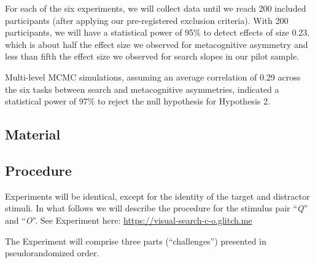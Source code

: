 \documentclass[
  english,
  man,floatsintext]{apa6}
\begin{document}
For each of the six experiments, we will collect data until we reach 200 included participants (after applying our pre-registered exclusion criteria). With 200 participants, we will have a statistical power of 95\% to detect effects of size 0.23, which is about half the effect size we observed for metacognitive asymmetry and less than fifth the effect size we observed for search slopes in our pilot sample.

Multi-level MCMC simulations, assuming an average correlation of 0.29 across the six tasks between search and metacognitive asymmetries, indicated a statistical power of 97\% to reject the null hypothesis for Hypothesis 2.

\hypertarget{material}{%
\subsection{Material}\label{material}}

\hypertarget{procedure}{%
\subsection{Procedure}\label{procedure}}

Experiments will be identical, except for the identity of the target and distractor stimuli. In what follows we will describe the procedure for the stimulus pair \enquote{\emph{Q}} and \enquote{\emph{O}}. See Experiment here: \url{https://visual-search-c-o.glitch.me}

The Experiment will comprise three parts (\enquote{challenges}) presented in pseudorandomized order.
\end{document}
